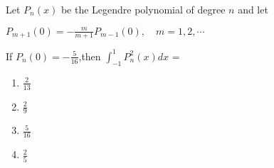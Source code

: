                \item Let $P_n(x)$ be the Legendre polynomial of degree $n$ and let 
                \begin{center}
                     $P_{m+1}(0)=-\frac{m}{m+1}P_{m-1}(0), \quad m=1,2,\cdots$
                \end{center}
                If $P_n(0)=-\frac{5}{16}$,then \quad $\int_{-1}^{1}P_n^2(x)dx$ =
                \begin{multicols}{4}
                \begin{enumerate}
                    \item $\frac{2}{13}$
                    \item $\frac{2}{9}$
                    \item $\frac{5}{16}$
                    \item $\frac{2}{5}$
                \end{enumerate}
                    
                \end{multicols}
            
            
